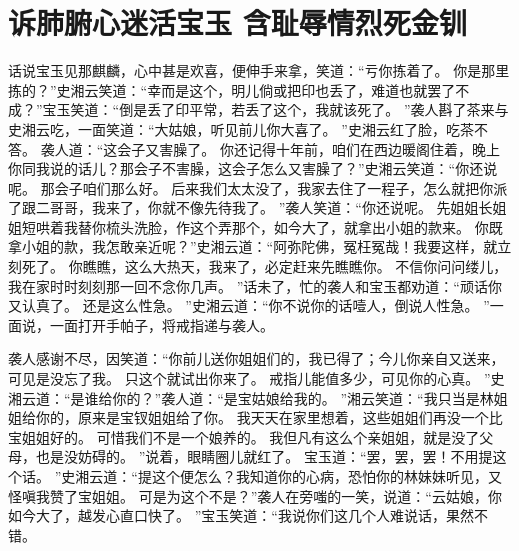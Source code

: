 \chapter{诉肺腑心迷活宝玉 \quad 含耻辱情烈死金钏}
\par
话说宝玉见那麒麟，心中甚是欢喜，便伸手来拿，笑道：“亏你拣着了。
你是那里拣的？”史湘云笑道：“幸而是这个，明儿倘或把印也丢了，难道也就罢了不成？”宝玉笑道：“倒是丢了印平常，若丢了这个，我就该死了。
”袭人斟了茶来与史湘云吃，一面笑道：“大姑娘，听见前儿你大喜了。
”史湘云红了脸，吃茶不答。
袭人道：“这会子又害臊了。
你还记得十年前，咱们在西边暖阁住着，晚上你同我说的话儿？那会子不害臊，这会子怎么又害臊了？”史湘云笑道：“你还说呢。
那会子咱们那么好。
后来我们太太没了，我家去住了一程子，怎么就把你派了跟二哥哥，我来了，你就不像先待我了。
”袭人笑道：“你还说呢。
先姐姐长姐姐短哄着我替你梳头洗脸，作这个弄那个，如今大了，就拿出小姐的款来。
你既拿小姐的款，我怎敢亲近呢？”史湘云道：“阿弥陀佛，冤枉冤哉！我要这样，就立刻死了。
你瞧瞧，这么大热天，我来了，必定赶来先瞧瞧你。
不信你问问缕儿，我在家时时刻刻那一回不念你几声。
”话未了，忙的袭人和宝玉都劝道：“顽话你又认真了。
还是这么性急。
”史湘云道：“你不说你的话噎人，倒说人性急。
”一面说，一面打开手帕子，将戒指递与袭人。
\par
袭人感谢不尽，因笑道：“你前儿送你姐姐们的，我已得了；今儿你亲自又送来，可见是没忘了我。
只这个就试出你来了。
戒指儿能值多少，可见你的心真。
”史湘云道：“是谁给你的？”袭人道：“是宝姑娘给我的。
”湘云笑道：“我只当是林姐姐给你的，原来是宝钗姐姐给了你。
我天天在家里想着，这些姐姐们再没一个比宝姐姐好的。
可惜我们不是一个娘养的。
我但凡有这么个亲姐姐，就是没了父母，也是没妨碍的。
”说着，眼睛圈儿就红了。
宝玉道：“罢，罢，罢！不用提这个话。
”史湘云道：“提这个便怎么？我知道你的心病，恐怕你的林妹妹听见，又怪嗔我赞了宝姐姐。
可是为这个不是？”袭人在旁嗤的一笑，说道：“云姑娘，你如今大了，越发心直口快了。
”宝玉笑道：“我说你们这几个人难说话，果然不错。

